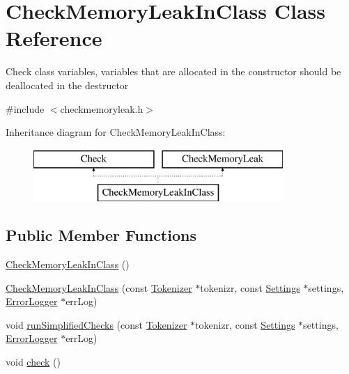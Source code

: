 \hypertarget{class_check_memory_leak_in_class}{\section{Check\-Memory\-Leak\-In\-Class Class Reference}
\label{class_check_memory_leak_in_class}
}


Check class variables, variables that are allocated in the constructor should be deallocated in the destructor  




{\ttfamily \#include $<$checkmemoryleak.\-h$>$}

Inheritance diagram for Check\-Memory\-Leak\-In\-Class\-:\begin{figure}[H]
\begin{center}
\leavevmode
\includegraphics[height=2.000000cm]{class_check_memory_leak_in_class}
\end{center}
\end{figure}
\subsection*{Public Member Functions}
\begin{DoxyCompactItemize}
\item 
\hyperlink{class_check_memory_leak_in_class_a4d16915216bf0b884117683f53388424}{Check\-Memory\-Leak\-In\-Class} ()
\item 
\hyperlink{class_check_memory_leak_in_class_a0efbe07d9a92543c20bc848531c98d04}{Check\-Memory\-Leak\-In\-Class} (const \hyperlink{class_tokenizer}{Tokenizer} $\ast$tokenizr, const \hyperlink{class_settings}{Settings} $\ast$settings, \hyperlink{class_error_logger}{Error\-Logger} $\ast$err\-Log)
\item 
void \hyperlink{class_check_memory_leak_in_class_a9dcb180e28838c7182be3008b7332423}{run\-Simplified\-Checks} (const \hyperlink{class_tokenizer}{Tokenizer} $\ast$tokenizr, const \hyperlink{class_settings}{Settings} $\ast$settings, \hyperlink{class_error_logger}{Error\-Logger} $\ast$err\-Log)
\item 
void \hyperlink{class_check_memory_leak_in_class_a35e1cc52d855646275cbf6050502ee74}{check} ()
\end{DoxyCompactItemize}
